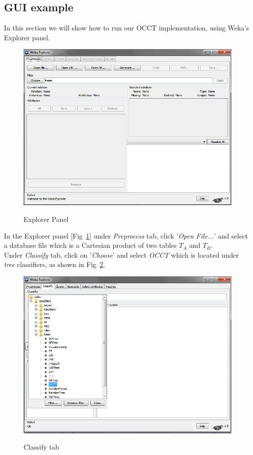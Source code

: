 \documentclass[a4paper,12pt]{article}
\newcommand{\newpar}{\smallskip\noindent} %
\begin{document}
\begin{spacing}{1.5}
\section{GUI example}
In this section we will show how to run our OCCT implementation, using Weka's Explorer panel.
\begin{figure}[!h]
  \centering
  \includegraphics[width=1\textwidth]{Figures/GUI/MainExplorer}\\
  \caption{Explorer Panel}
  \label{fig:wekaexplorer}
\end{figure}
\newpar
In the Explorer panel [Fig~\ref{fig:wekaexplorer}] under {\em Preprocess} tab, click '{\em Open File...}'
and select a database file which is a Cartesian product of two tables $T_{A}$ and $T_{B}$.\\
\clearpage
Under {\em Classify} tab, click on '{\em Choose}' and select {\em OCCT} which is located under {\em tree} classifiers,
as shown in Fig~\ref{fig:occtPre}. 
\begin{figure}[!h]
  \centering
  \includegraphics[width=1\textwidth]{Figures/GUI/OCCTPre}\\
  \caption{Classify tab}
  \label{fig:occtPre}
\end{figure}\\



\end{spacing}
\end{document}
